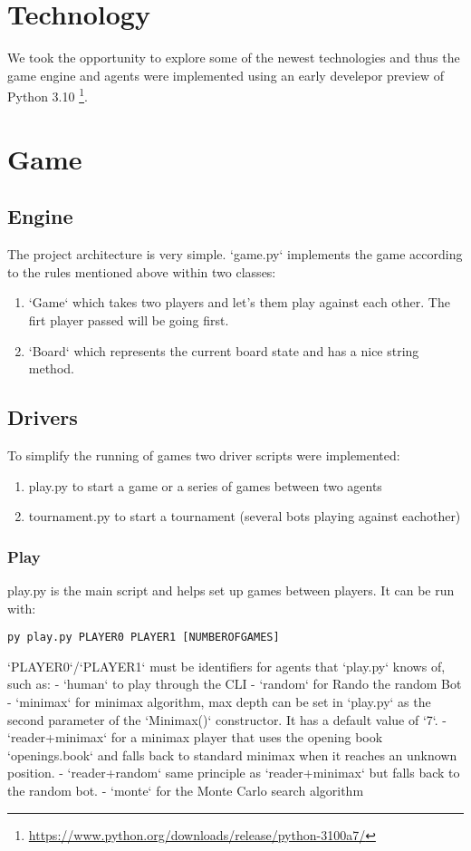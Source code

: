 \section{Technology}
We took the opportunity to explore some of the newest technologies
and thus the game engine and agents were implemented using an early develepor preview of Python 3.10
\footnote{\url{https://www.python.org/downloads/release/python-3100a7/}}.

\section{Game}

\subsection{Engine}
The project architecture is very simple.
`game.py` implements the game according to the rules mentioned above within two classes:
\begin{enumerate}
    \item `Game` which takes two players and let's them play against each other. The firt player passed will be going first.
    \item `Board` which represents the current board state and has a nice string method.
\end{enumerate}

\subsection{Drivers}
To simplify the running of games two driver scripts were implemented:
\begin{enumerate}
    \item play.py to start a game or a series of games between two agents
    \item tournament.py to start a tournament (several bots playing against eachother)
\end{enumerate}
\subsubsection{Play}
play.py is the main script and helps set up games between players.
It can be run with:

\lstinline{py play.py PLAYER0 PLAYER1 [NUMBEROFGAMES]}

`PLAYER0`/`PLAYER1` must be identifiers for agents that `play.py` knows of, such as:
- `human` to play through the CLI
- `random` for Rando the random Bot
- `minimax` for minimax algorithm, max depth can be set in `play.py` as the second parameter of the `Minimax()` constructor. It has a default value of `7`.
- `reader+minimax` for a minimax player that uses the opening book `openings.book` and falls back to standard minimax when it reaches an unknown position.
- `reader+random` same principle as `reader+minimax` but falls back to the random bot.
- `monte` for the Monte Carlo search algorithm

